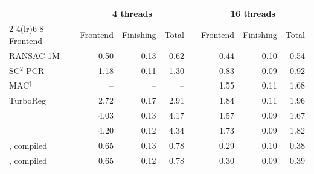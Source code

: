 \begin{tabular}{lrrrrrrr}
\toprule
 & \multicolumn{3}{c}{4 threads} & & \multicolumn{3}{c}{16 threads} \\
\cmidrule(lr){2-4}\cmidrule(lr){6-8}
Frontend & Frontend & Finishing & Total & & Frontend & Finishing & Total \\
\midrule
RANSAC-1M & 0.50 & 0.13 & 0.62 & & 0.44 & 0.10 & 0.54 \\
SC$^2$-PCR & 1.18 & 0.11 & 1.30 & & 0.83 & 0.09 & 0.92 \\
MAC$^\dagger$ & -- & -- & -- & & 1.55 & 0.11 & 1.68 \\
TurboReg & 2.72 & 0.17 & 2.91 & & 1.84 & 0.11 & 1.96 \\
\ngr{} & 4.03 & 0.13 & 4.17 & & 1.57 & 0.09 & 1.67 \\
\ls{} & 4.20 & 0.12 & 4.34 & & 1.73 & 0.09 & 1.82 \\
\midrule
\ngr{}, compiled & 0.65 & 0.13 & 0.78 & & 0.29 & 0.10 & 0.38 \\
\ls{}, compiled & 0.65 & 0.12 & 0.78 & & 0.30 & 0.09 & 0.39 \\
\bottomrule
\end{tabular}
